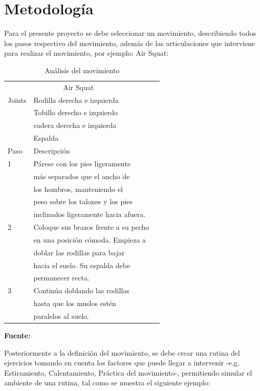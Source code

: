 \documentclass[twoside,twocolumn]{article}
\begin{document}
\section{Metodología}
Para el presente proyecto se debe seleccionar un movimiento, describiendo todos los pasos respectivo del movimiento, además de las articulaciones que interviene para realizar el movimiento, por ejemplo: Air Squat:
\begin{table}[H]
\caption{Análisis del movimiento}
\centering
\begin{tabular}{llr}
\toprule
\multicolumn{2}{c}{Air Squat} \\
\cmidrule(r){1-2}
Joints & Rodilla derecha e izquierda \\
     & Tobillo derecho e izquierdo \\
     & cadera derecha e izquierda \\
     & Espalda \\
\cmidrule(r){1-2}
Paso & Descripción \\
\midrule
1 & Párese con los pies ligeramente      \\
  & más separados que el ancho de        \\
  & los hombros, manteniendo el          \\
  & peso  sobre los talones y los pies 	 \\
  & inclinados ligeramente hacia afuera. \\
2 & Coloque sus brazos frente a su pecho \\
  & en una posición cómoda. Empieza a    \\
  & doblar las rodillas para bajar       \\
  & hacia el suelo. Su espalda debe      \\
  & permanecer recta. 					 \\
3 & Continúa doblando las rodillas       \\
  & hasta que los muslos estén           \\
  & paralelos al suelo.                  \\
\bottomrule
\end{tabular}
\textbf{Fuente:} 
\end{table}
\medbreak 
Posteriormente a la definición del movimiento, se debe crear una rutina del ejercicios tomando en cuenta los factores que puede llegar a intervenir -e.g. Estiramiento, Calentamiento, Práctica del movimiento-, permitiendo simular el ambiente de una rutina, tal como se muestra el siguiente ejemplo:
\end{document}
